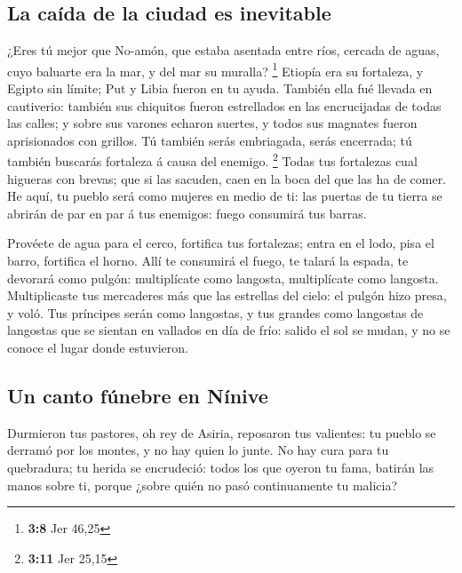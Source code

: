 \hypertarget{la-cauxedda-de-la-ciudad-es-inevitable}{%
\subsection{La caída de la ciudad es
inevitable}\label{la-cauxedda-de-la-ciudad-es-inevitable}}

 ¿Eres tú mejor que No-amón, que estaba asentada entre
ríos, cercada de aguas, cuyo baluarte era la mar, y del mar su muralla?
\footnote{\textbf{3:8} Jer 46,25}  Etiopía era su
fortaleza, y Egipto sin límite; Put y Libia fueron en tu ayuda.
 También ella fué llevada en cautiverio: también sus
chiquitos fueron estrellados en las encrucijadas de todas las calles; y
sobre sus varones echaron suertes, y todos sus magnates fueron
aprisionados con grillos.  Tú también serás embriagada,
serás encerrada; tú también buscarás fortaleza á causa del enemigo.
\footnote{\textbf{3:11} Jer 25,15}  Todas tus fortalezas
cual higueras con brevas; que si las sacuden, caen en la boca del que
las ha de comer.  He aquí, tu pueblo será como mujeres en
medio de ti: las puertas de tu tierra se abrirán de par en par á tus
enemigos: fuego consumirá tus barras.

 Provéete de agua para el cerco, fortifica tus
fortalezas; entra en el lodo, pisa el barro, fortifica el horno.
 Allí te consumirá el fuego, te talará la espada, te
devorará como pulgón: multiplícate como langosta, multiplícate como
langosta.  Multiplicaste tus mercaderes más que las
estrellas del cielo: el pulgón hizo presa, y voló.  Tus
príncipes serán como langostas, y tus grandes como langostas de
langostas que se sientan en vallados en día de frío: salido el sol se
mudan, y no se conoce el lugar donde estuvieron.

\hypertarget{un-canto-fuxfanebre-en-nuxednive}{%
\subsection{Un canto fúnebre en
Nínive}\label{un-canto-fuxfanebre-en-nuxednive}}

 Durmieron tus pastores, oh rey de Asiria, reposaron tus
valientes: tu pueblo se derramó por los montes, y no hay quien lo junte.
 No hay cura para tu quebradura; tu herida se encrudeció:
todos los que oyeron tu fama, batirán las manos sobre ti, porque ¿sobre
quién no pasó continuamente tu malicia?
